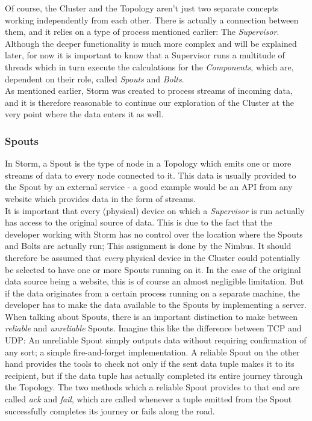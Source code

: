 \documentclass[12pt,a4paper]{article}
\begin{document}
Of course, the Cluster and the Topology aren't just two separate concepts working independently from each other. There is actually a connection between them, and it relies on a type of process mentioned earlier: The \textit{Supervisor}. Although the deeper functionality is much more complex and will be explained later, for now it is important to know that a Supervisor runs a multitude of threads which in turn execute the calculations for the \textit{Components}, which are, dependent on their role, called \textit{Spouts} and \textit{Bolts}.\\

As mentioned earlier, Storm was created to process streams of incoming data, and it is therefore reasonable to continue our exploration of the Cluster at the very point where the data enters it as well.

\subsubsection{Spouts}

In Storm, a Spout is the type of node in a Topology which emits one or more streams of data to every node connected to it. This data is usually provided to the Spout by an external service - a good example would be an API from any website which provides data in the form of streams. \\

It is important that every (physical) device on which a \textit{Supervisor} is run actually has access to the original source of data. This is due to the fact that the developer working with Storm has no control over the location where the Spouts and Bolts are actually run; This assignment is done by the Nimbus. It should therefore be assumed that \textit{every} physical device in the Cluster could potentially be selected to have one or more Spouts running on it. In the case of the original data source being a website, this is of course an almost negligible limitation. But if the data originates from a certain process running on a separate machine, the developer has to make the data available to the Spouts by implementing a server.\\

When talking about Spouts, there is an important distinction to make between \textit{reliable} and \textit{unreliable} Spouts. Imagine this like the difference between TCP and UDP: An unreliable Spout simply outputs data without requiring confirmation of any sort; a simple fire-and-forget implementation. A reliable Spout on the other hand provides the tools to check not only if the sent data tuple makes it to its recipient, but if the data tuple has actually completed its entire journey through the Topology. The two methods which a reliable Spout provides to that end are called \textit{ack} and \textit{fail}, which are called whenever a tuple emitted from the Spout successfully completes its journey or fails along the road.\\
\end{document}
